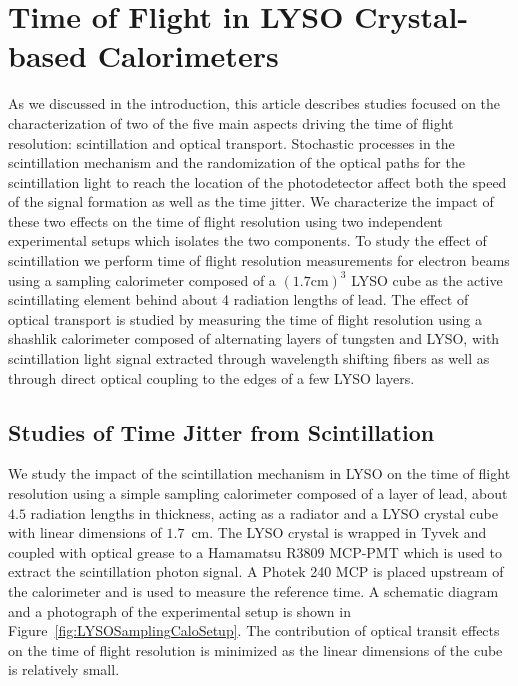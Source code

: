 \documentclass[12pt]{article}
\begin{document}
\section{Time of Flight in LYSO Crystal-based Calorimeters}

As we discussed in the introduction, this article describes studies
focused on the characterization of two of the five main aspects
driving the time of flight resolution: scintillation and 
optical transport. Stochastic processes in the scintillation
mechanism and the randomization of the optical paths for the 
scintillation light to reach the location of the photodetector 
affect both the speed of the signal formation
as well as the time jitter. We characterize the impact of
these two effects on the time of flight resolution using
two independent experimental setups which isolates the
two components. To study the effect of scintillation
we perform time of flight resolution measurements
for electron beams using a sampling calorimeter composed of a 
$(1.7\mathrm{ cm})^{3}$ LYSO cube as the active 
scintillating element behind about 4 radiation lengths of lead. 
The effect of optical transport is studied by measuring
the time of flight resolution using a shashlik 
calorimeter composed of alternating layers of tungsten
and LYSO, with scintillation light signal extracted
through wavelength shifting fibers as well as 
through direct optical coupling to the edges of a few
LYSO layers. 


\subsection{Studies of Time Jitter from Scintillation}

We study the impact of the scintillation mechanism in LYSO
on the time of flight resolution using a simple 
sampling calorimeter composed of a layer of
lead, about $4.5$ radiation lengths in thickness, acting
as a radiator and a LYSO crystal cube with linear dimensions 
of $1.7$~cm. The LYSO crystal is wrapped in Tyvek and  
coupled with optical grease to a Hamamatsu R3809 MCP-PMT
which is used to extract the scintillation photon signal. 
A Photek 240 MCP is placed upstream of the calorimeter and 
is used to measure the reference time. A schematic diagram
and a photograph of the experimental setup
is shown in Figure~\ref{fig:LYSOSamplingCaloSetup}. 
The contribution of optical transit effects on the 
time of flight resolution is minimized as the linear
dimensions of the cube is relatively small.
\end{document}

